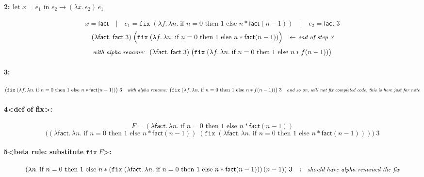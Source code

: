 \documentclass{article}
\theoremstyle{theorem}
\theoremstyle{definition}
\theoremstyle{remark}
\begin{document}
\paragraph{2: \(\text{let } x = e_1 \text{ in } e_2 \to (\lambda x.\,e_2)\,e_1\)}
\[
x = \mathsf{fact}
\quad\big|\quad
e_1 = \texttt{fix}\;(\lambda f.\,\lambda n.\; \text{if } n=0 \text{ then } 1 \text{ else } n * \mathsf{fact}(n-1))
\quad\big|\quad
e_2 = \mathsf{fact}\;3
\]
\[
(\lambda \mathsf{fact}.\; \mathsf{fact}\;3)\;\Big(\texttt{fix}\;(\lambda f.\,\lambda n.\; \text{if } n=0 \text{ then } 1 \text{ else } n * \mathsf{fact}(n-1))\Big)
\quad \textit{\small\(\leftarrow\) end of step 2}
\]
\[
\textit{\small with alpha rename: } \; (\lambda \mathsf{fact}.\; \mathsf{fact}\;3)\;\big(\texttt{fix}\;(\lambda f.\, \lambda n.\; \text{if } n=0 \text{ then } 1 \text{ else } n * f(n-1))\big)
\]

\paragraph{3:}
\[
\big(\texttt{fix}\;(\lambda f.\,\lambda n.\; \text{if } n=0 \text{ then } 1 \text{ else } n * \mathsf{fact}(n-1))\big)\;3
\quad
\textit{\small with alpha rename: }
\big(\texttt{fix}\;(\lambda f.\, \lambda n.\; \text{if } n=0 \text{ then } 1 \text{ else } n * f(n-1))\big)\;3
\quad
\textit{\small and so on, will not fix completed code, this is here just for note}
\]

\paragraph{4\textless def of fix\textgreater:}
\[
F = (\lambda \mathsf{fact}.\,\lambda n.\; \text{if } n=0 \text{ then } 1 \text{ else } n * \mathsf{fact}(n-1))
\]
\[
\Big((\lambda \mathsf{fact}.\,\lambda n.\; \text{if } n=0 \text{ then } 1 \text{ else } n * \mathsf{fact}(n-1))
\;(\texttt{fix}\;(\lambda \mathsf{fact}.\,\lambda n.\; \text{if } n=0 \text{ then } 1 \text{ else } n * \mathsf{fact}(n-1)))\Big)\;3
\]

\paragraph{5\textless beta rule: substitute \(\texttt{fix}\;F\)\textgreater:}
\[
(\lambda n.\; \text{if } n=0 \text{ then } 1 \text{ else } n * (\texttt{fix}\;(\lambda \mathsf{fact}.\,\lambda n.\; \text{if } n=0 \text{ then } 1 \text{ else } n * \mathsf{fact}(n-1)))\,(n-1))\;3
\quad \textit{\small \(\leftarrow\) should have alpha renamed the fix}
\]
\end{document}
